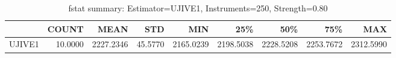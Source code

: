 \begin{table}[ht]
\centering
\caption{fstat summary: Estimator=UJIVE1, Instruments=250, Strength=0.80}
\begin{tabular}{lrrrrrrrr}
\toprule
 & COUNT & MEAN & STD & MIN & 25\% & 50\% & 75\% & MAX \\
\midrule
UJIVE1 & 10.0000 & 2227.2346 & 45.5770 & 2165.0239 & 2198.5038 & 2228.5208 & 2253.7672 & 2312.5990 \\
\bottomrule
\end{tabular}
\end{table}
